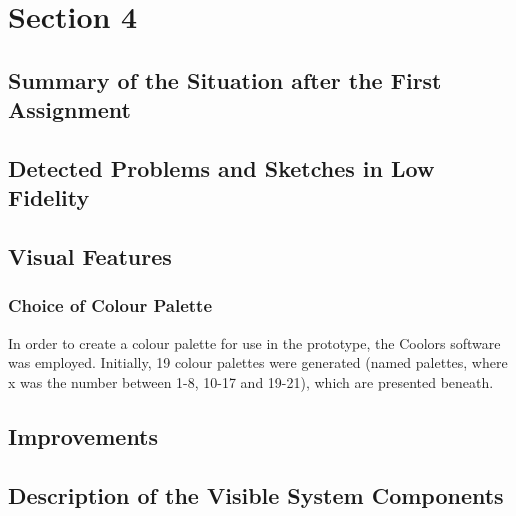 \chapter{Section 4}
\section{Summary of the Situation after the First Assignment}
\section{Detected Problems and Sketches in Low Fidelity}
\section{Visual Features}
\subsection{Choice of Colour Palette}
In order to create a colour palette for use in the prototype, 
the Coolors software was employed. Initially, 19 colour 
palettes were generated (named palettes, where x was the 
number between 1-8, 10-17 and 19-21), which are presented beneath.
\section{Improvements}
\section{Description of the Visible System Components}